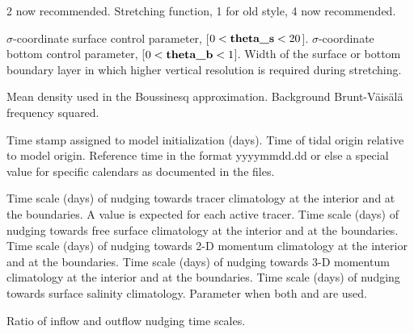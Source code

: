 \begin{klist}
\begin{klist}
       2 now recommended.
        Stretching function, 1 for old style, 4
       now recommended.
     \end{klist}
    \mbox{}
     \begin{klist}
         $\sigma$-coordinate surface control parameter,
     [$0 < \mbox{\bf theta\_s} < 20$].
         $\sigma$-coordinate bottom  control parameter,
     [$0 < \mbox{\bf theta\_b} < 1$].
          Width of the surface or bottom boundary layer
     in which higher vertical resolution is required during stretching.
     \end{klist}
    \mbox{}
     \begin{klist}
            Mean density used in the Boussinesq
     approximation.
        Background Brunt-V\"ais\"al\"a frequency squared.
     \end{klist}
    \mbox{}
     \begin{klist}
          Time stamp assigned to model initialization
     (days).
          Time of tidal origin relative to model
       origin.
         Reference time in the format yyyymmdd.dd or
       else a special value for specific calendars as documented in the
        files.
     \end{klist}
   \mbox{}
     \begin{klist}
           Time scale (days) of nudging towards
     tracer climatology at the interior and at the boundaries.
     A value is expected for each active tracer.
           Time scale (days) of nudging towards
     free surface climatology at the interior and at the boundaries.
           Time scale (days) of nudging towards
     2-D momentum climatology at the interior and at the boundaries.
           Time scale (days) of nudging towards
     3-D momentum climatology at the interior and at the boundaries.
           Time scale (days) of nudging towards
     surface salinity climatology.
        Parameter when both
      and  are used.
     \end{klist}
    \mbox{}
     \begin{klist}
          Ratio of inflow and outflow nudging time scales.

\end{klist}
\end{klist}
